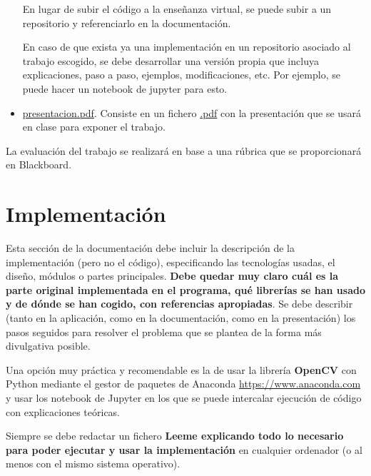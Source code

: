 \documentclass[a4paper]{article}
\begin{document}
\begin{itemize}
En lugar de subir el código a la enseñanza virtual, se puede subir a un repositorio y referenciarlo en la documentación. 

En caso de que exista ya una implementación en un repositorio asociado al trabajo escogido, se debe desarrollar una versión propia que incluya explicaciones, paso a paso, ejemplos, modificaciones, etc. Por ejemplo, se puede hacer un notebook de jupyter para esto.



\item \url{presentacion.pdf}. Consiste en un fichero \url{.pdf} con la presentación que se usará en clase para exponer el trabajo.
\end{itemize}

La evaluación del trabajo se realizará en base a una rúbrica que se proporcionará en Blackboard.





\section{Implementación}

Esta sección de la documentación  debe incluir la descripción de la implementación (pero no el código), especificando las tecnologías usadas, el diseño, módulos o partes principales. \textbf{Debe quedar muy claro cuál es la parte original implementada en el programa, qué librerías se han usado y de dónde se han cogido, con referencias apropiadas}. Se debe describir (tanto en la aplicación, como en la documentación, como en la presentación) los pasos seguidos para resolver el problema que se plantea de la forma más divulgativa posible. 

Una opción muy práctica y recomendable es la de usar la librería \textbf{OpenCV} con Python mediante el gestor de paquetes de Anaconda \url{https://www.anaconda.com} y usar los notebook de Jupyter en los que se puede intercalar ejecución de código con explicaciones teóricas. %

Siempre se debe redactar un fichero {\bf Leeme explicando todo lo necesario para poder ejecutar y usar la implementación} en cualquier ordenador (o al menos con el mismo sistema operativo).
\end{document}
